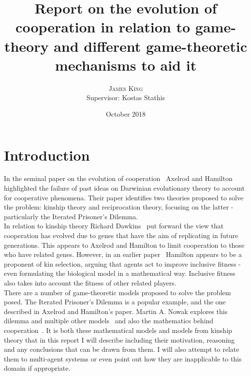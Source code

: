 \documentclass[twoside,twocolumn]{article}
\title{Report on the evolution of cooperation in relation to game-theory and different game-theoretic mechanisms to aid it} %
\author{%
\textsc{James King} \\%
\normalsize Supervisor: Kostas Stathis \\ %
}
\date{October 2018} %
\begin{document}


\maketitle


\section{Introduction}
In the seminal paper on the evolution of cooperation~\cite{evolution_of_cooperation} Axelrod and Hamilton highlighted the failure of past ideas on Darwinian evolutionary theory to account for cooperative phenomena. Their paper identifies two theories proposed to solve the problem: kinship theory and reciprocation theory, focusing on the latter - particularly the Iterated Prisoner's Dilemma.\\ 
In relation to kinship theory Richard Dawkins~\cite{selfish_gene} put forward the view that cooperation has evolved due to genes that have the aim of replicating in future generations. This appears to Axelrod and Hamilton to limit cooperation to those who have related genes. However, in an earlier paper~\cite{kinhamilton} Hamilton appears to be a proponent of kin selection, arguing that agents act to improve inclusive fitness - even formulating the biological model in a mathematical way. Inclusive fitness also takes into account the fitness of other related players.\\
There are a number of game-theoretic models proposed to solve the problem posed. The Iterated Prisoner's Dilemma is a popular example, and the one described in Axelrod and Hamilton's paper. Martin A. Nowak explores this dilemma and multiple other models~\cite{five_rules_coop} and also the mathematics behind cooperation~\cite{arithmetics_of_mutual_help}. It is both these mathematical models and models from kinship theory that in this report I will describe including their motivation, reasoning and any conclusions that can be drawn from them. I will also attempt to relate them to multi-agent systems or even point out how they are inapplicable to this domain if appropriate.\\
\end{document}
